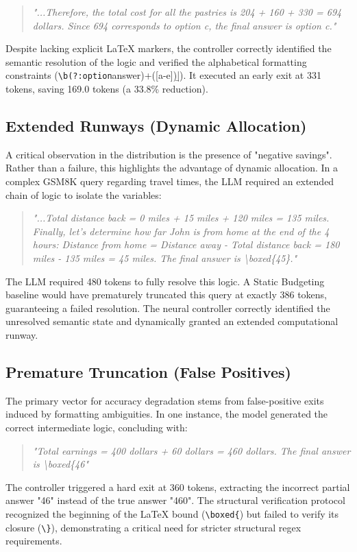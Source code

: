 \documentclass[11pt]{article}
\begin{document}
\begin{quote}
\small
\textit{"...Therefore, the total cost for all the pastries is 204 + 160 + 330 = 694 dollars. Since 694 corresponds to option c, the final answer is option c."}
\normalsize
\end{quote}

Despite lacking explicit LaTeX markers, the controller correctly identified the semantic resolution of the logic and verified the alphabetical formatting constraints (\verb|\b(?:option|answer)\s+([a-e])\b|). It executed an early exit at 331 tokens, saving 169.0 tokens (a 33.8\% reduction).

\subsection{Extended Runways (Dynamic Allocation)}
A critical observation in the distribution is the presence of "negative savings". Rather than a failure, this highlights the advantage of dynamic allocation. In a complex GSM8K query regarding travel times, the LLM required an extended chain of logic to isolate the variables:

\begin{quote}
\small
\textit{"...Total distance back = 0 miles + 15 miles + 120 miles = 135 miles. Finally, let's determine how far John is from home at the end of the 4 hours: Distance from home = Distance away - Total distance back = 180 miles - 135 miles = 45 miles. The final answer is \textbackslash boxed\{45\}."}
\normalsize
\end{quote}

The LLM required 480 tokens to fully resolve this logic. A Static Budgeting baseline would have prematurely truncated this query at exactly 386 tokens, guaranteeing a failed resolution. The neural controller correctly identified the unresolved semantic state and dynamically granted an extended computational runway.

\subsection{Premature Truncation (False Positives)}
The primary vector for accuracy degradation stems from false-positive exits induced by formatting ambiguities. In one instance, the model generated the correct intermediate logic, concluding with:
\begin{quote}
\small
\textit{"Total earnings = 400 dollars + 60 dollars = 460 dollars. The final answer is \textbackslash boxed\{46"}
\normalsize
\end{quote}
The controller triggered a hard exit at 360 tokens, extracting the incorrect partial answer "46" instead of the true answer "460". The structural verification protocol recognized the beginning of the LaTeX bound (\verb|\boxed{|) but failed to verify its closure (\verb|\}|), demonstrating a critical need for stricter structural regex requirements.
\end{document}
